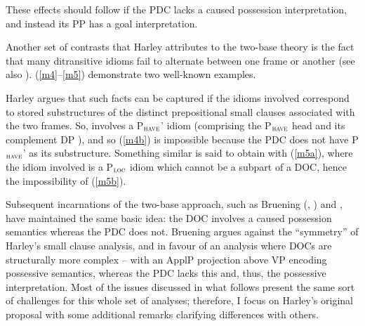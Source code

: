 \documentclass[output=paper,colorlinks,citecolor=brown]{langscibook}
\begin{document}


\noindent These effects should follow if the PDC lacks a caused possession interpretation, and instead its PP has a goal interpretation.

Another set of contrasts that Harley attributes to the two-base theory is the fact that many ditransitive idioms fail to alternate between one frame or another (see also \citealt{gt:Richards:2001}). (\ref{m4}--\ref{m5}) demonstrate two well-known examples. 




\noindent Harley argues that such facts can be captured if the idioms involved correspond to stored  substructures of the distinct prepositional small clauses associated with the two frames. So,  involves a P$_{\textsc{have}}$' idiom (comprising the P$_{\textsc{have}}$ head and its complement DP ), and so (\ref{m4b}) is impossible because the PDC does not have P$_{\textsc{have}}$' as its substructure. Something similar is said to obtain with (\ref{m5a}), where the idiom involved is a P$_{\textsc{loc}}$ idiom which cannot be a subpart of a DOC, hence the impossibility of (\ref{m5b}). 

Subsequent incarnations of the two-base approach, such as Bruening (\citeyear{gt:Bruening:2010a}, \citeyear{gt:Bruening:2010b}) and \citet{gt:Harley:2015}, have maintained the same basic idea: the DOC involves a caused possession semantics whereas the PDC does not. Bruening argues against the ``symmetry'' of Harley's small clause analysis, and in favour of an analysis where DOCs are structurally more complex -- with an ApplP projection above VP encoding possessive semantics, whereas the PDC lacks this and, thus, the possessive interpretation. Most of the issues discussed in what follows present the same sort of challenges for this whole set of analyses; therefore, I focus on Harley's original proposal with some additional remarks clarifying differences with others. 
\end{document}
